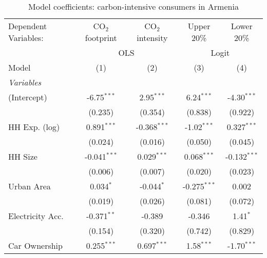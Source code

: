 
\begin{table}[htbp!]
   \centering
   \small
   \begin{adjustbox}{width = 1\textwidth, max height = 0.95\textheight, center}
      \begin{threeparttable}[b]
         \caption{\label{tab:Logit_1_ARM} Model coefficients: carbon-intensive consumers in Armenia}
         \begin{tabular}{lcccc}
            \tabularnewline \midrule \midrule
            Dependent Variables: & CO$_{2}$ footprint & CO$_{2}$ intensity & Upper 20\%     & Lower 20\%\\   
             & \multicolumn{2}{c}{OLS} & \multicolumn{2}{c}{Logit} \\ 
            Model                & (1)                & (2)                & (3)            & (4)\\  
            \midrule
            \emph{Variables}\\
            (Intercept)          & -6.75$^{***}$      & 2.95$^{***}$       & 6.24$^{***}$   & -4.30$^{***}$\\   
                                 & (0.235)            & (0.354)            & (0.838)        & (0.922)\\   
            HH Exp. (log)        & 0.891$^{***}$      & -0.368$^{***}$     & -1.02$^{***}$  & 0.327$^{***}$\\   
                                 & (0.024)            & (0.016)            & (0.050)        & (0.045)\\   
            HH Size              & -0.041$^{***}$     & 0.029$^{***}$      & 0.068$^{***}$  & -0.132$^{***}$\\   
                                 & (0.006)            & (0.007)            & (0.020)        & (0.023)\\   
            Urban Area           & 0.034$^{*}$        & -0.044$^{*}$       & -0.275$^{***}$ & 0.002\\   
                                 & (0.019)            & (0.026)            & (0.081)        & (0.072)\\   
            Electricity Acc.     & -0.371$^{**}$      & -0.389             & -0.346         & 1.41$^{*}$\\   
                                 & (0.154)            & (0.320)            & (0.742)        & (0.829)\\   
            Car Ownership        & 0.255$^{***}$      & 0.697$^{***}$      & 1.58$^{***}$   & -1.70$^{***}$\\   

\end{tabular}
\end{threeparttable}
\end{adjustbox}
\end{table}
